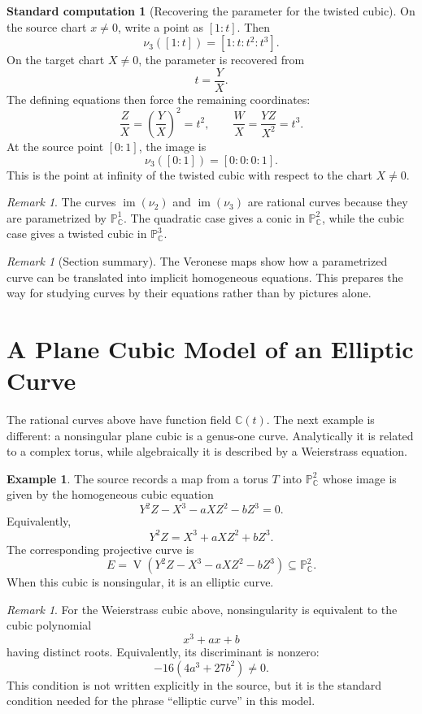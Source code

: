 \documentclass[11pt]{article}
\theoremstyle{definition}
\newtheorem{example}[theorem]{Example}
\newtheorem{calculation}[theorem]{Standard computation}
\theoremstyle{remark}
\newtheorem{remark}[theorem]{Remark}
\newcommand{\C}{\mathbb{C}}
\newcommand{\Pj}{\mathbb{P}}
\newcommand{\V}{\operatorname{V}}
\newcommand{\image}{\operatorname{im}}
\begin{document}
\begin{calculation}[Recovering the parameter for the twisted cubic]
On the source chart \(x\neq 0\), write a point as \([1:t]\).  Then
\[
  \nu_3([1:t])=[1:t:t^2:t^3].
\]
On the target chart \(X\neq 0\), the parameter is recovered from
\[
  t=\frac{Y}{X}.
\]
The defining equations then force the remaining coordinates:
\[
  \frac{Z}{X}
  =
  \left(\frac{Y}{X}\right)^2=t^2,
  \qquad
  \frac{W}{X}
  =
  \frac{YZ}{X^2}=t^3.
\]
At the source point \([0:1]\), the image is
\[
  \nu_3([0:1])=[0:0:0:1].
\]
This is the point at infinity of the twisted cubic with respect to the chart
\(X\neq 0\).
\end{calculation}

\begin{remark}
The curves \(\image(\nu_2)\) and \(\image(\nu_3)\) are rational curves because
they are parametrized by \(\Pj^1_{\C}\).  The quadratic case gives a conic in
\(\Pj^2_{\C}\), while the cubic case gives a twisted cubic in
\(\Pj^3_{\C}\).
\end{remark}

\begin{remark}[Section summary]
The Veronese maps show how a parametrized curve can be translated into
implicit homogeneous equations.  This prepares the way for studying curves by
their equations rather than by pictures alone.
\end{remark}

\section{A Plane Cubic Model of an Elliptic Curve}

The rational curves above have function field \(\C(t)\).  The next example is
different: a nonsingular plane cubic is a genus-one curve.  Analytically it is
related to a complex torus, while algebraically it is described by a
Weierstrass equation.

\begin{example}
The source records a map from a torus \(T\) into \(\Pj^2_{\C}\) whose image is
given by the homogeneous cubic equation
\[
  Y^2Z-X^3-aXZ^2-bZ^3=0.
\]
Equivalently,
\[
  Y^2Z=X^3+aXZ^2+bZ^3.
\]
The corresponding projective curve is
\[
  E=\V(Y^2Z-X^3-aXZ^2-bZ^3)\subseteq \Pj^2_{\C}.
\]
When this cubic is nonsingular, it is an elliptic curve.
\end{example}

\begin{remark}
For the Weierstrass cubic above, nonsingularity is equivalent to the cubic
polynomial
\[
  x^3+ax+b
\]
having distinct roots.  Equivalently, its discriminant is nonzero:
\[
  -16(4a^3+27b^2)\neq 0.
\]
This condition is not written explicitly in the source, but it is the standard
condition needed for the phrase ``elliptic curve'' in this model.
\end{remark}
\end{document}
